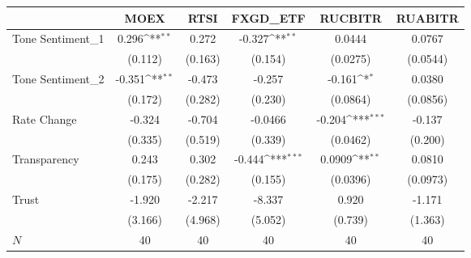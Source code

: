 {
\def\sym#1{\ifmmode^{#1}\else\(^{#1}\)\fi}
\begin{tabular}{l*{5}{c}}
\hline\hline
            &\multicolumn{1}{c}{MOEX}&\multicolumn{1}{c}{RTSI}&\multicolumn{1}{c}{FXGD\_ETF}&\multicolumn{1}{c}{RUCBITR}&\multicolumn{1}{c}{RUABITR}\\
\hline
Tone Sentiment\_{1}&       0.296\sym{**} &       0.272         &      -0.327\sym{**} &      0.0444         &      0.0767         \\
            &     (0.112)         &     (0.163)         &     (0.154)         &    (0.0275)         &    (0.0544)         \\
[1em]
Tone Sentiment\_{2}&      -0.351\sym{**} &      -0.473         &      -0.257         &      -0.161\sym{*}  &      0.0380         \\
            &     (0.172)         &     (0.282)         &     (0.230)         &    (0.0864)         &    (0.0856)         \\
[1em]
Rate Change &      -0.324         &      -0.704         &     -0.0466         &      -0.204\sym{***}&      -0.137         \\
            &     (0.335)         &     (0.519)         &     (0.339)         &    (0.0462)         &     (0.200)         \\
[1em]
Transparency&       0.243         &       0.302         &      -0.444\sym{***}&      0.0909\sym{**} &      0.0810         \\
            &     (0.175)         &     (0.282)         &     (0.155)         &    (0.0396)         &    (0.0973)         \\
[1em]
Trust       &      -1.920         &      -2.217         &      -8.337         &       0.920         &      -1.171         \\
            &     (3.166)         &     (4.968)         &     (5.052)         &     (0.739)         &     (1.363)         \\
\hline
\(N\)       &          40         &          40         &          40         &          40         &          40         \\
\hline\hline
\end{tabular}
}
